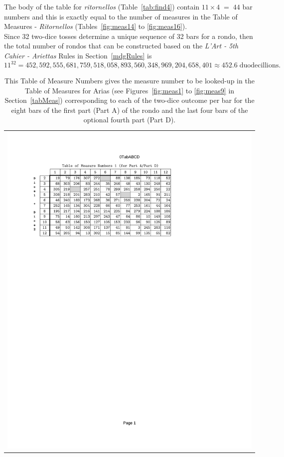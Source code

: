 \documentclass[a4paper,x11names,svgnames,10pt]{article}
\begin{document}
{The body of the table for {\it ritornellos} (Table~\ref{tab:find4}) contain $11 \times 4 \;=\; 44$ bar numbers and this is exactly equal to the number of measures in the Table of Measures - {\it Ritornellos} (Tables~\ref{fig:meas14} to \ref{fig:meas16}).\\

Since 32 two-dice tosses determine a unique sequence of 32 bars for a rondo, then the total number of rondos that can be constructed based on the {\em L'Art - 5th Cahier - Ariettas} Rules in Section~\ref{mdgRules} is $$11^{32} = 452\!,592\!,555\!,681\!,759\!,518\!,058\!,893\!,560\!,348\!,969\!,204\!,658\!,401 \approx 452.6\; \text{duodecillions}.$$


\begin{table}[H]
	\centering
	\begin{tabular}{c}
		\centering
		\includegraphics[clip=true,trim=0.75in 7.30in 2.50in 1.10in,scale=0.90]{0TAB-AD}
	\end{tabular}
	\caption{This Table of Measure Numbers gives the measure number to be looked-up in the Table of Measures for Arias (see Figures~\ref{fig:meas1} to \ref{fig:meas9} in Section~\ref{tabMeas}) corresponding to each of the two-dice outcome per bar for the eight bars of the first part (Part A) of the rondo and the last four bars of the optional fourth part (Part D).}
	\label{tab:find1}
\end{table}

}
\end{document}
